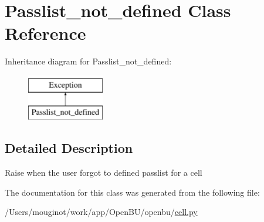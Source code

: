 \hypertarget{classopenbu_1_1cell_1_1_passlist__not__defined}{}\section{Passlist\+\_\+not\+\_\+defined Class Reference}
\label{classopenbu_1_1cell_1_1_passlist__not__defined}
Inheritance diagram for Passlist\+\_\+not\+\_\+defined\+:\begin{figure}[H]
\begin{center}
\leavevmode
\includegraphics[height=2.000000cm]{classopenbu_1_1cell_1_1_passlist__not__defined}
\end{center}
\end{figure}


\subsection{Detailed Description}
\begin{DoxyVerb}Raise when the user forgot to defined passlist for a cell\end{DoxyVerb}
 

The documentation for this class was generated from the following file\+:\begin{DoxyCompactItemize}
\item 
/\+Users/mouginot/work/app/\+Open\+B\+U/openbu/\mbox{\hyperlink{cell_8py}{cell.\+py}}\end{DoxyCompactItemize}
